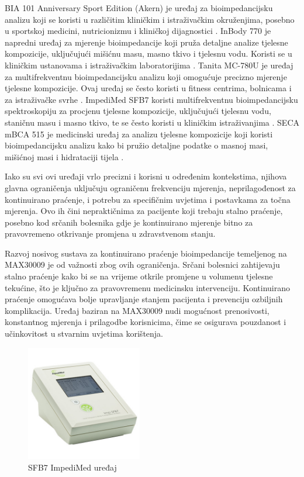 \documentclass[../diplomski_rad.tex]{subfiles}
\begin{document}
BIA 101 Anniversary Sport Edition (Akern) je uređaj za bioimpedancijsku analizu koji se koristi u različitim kliničkim 
i istraživačkim okruženjima, posebno u sportskoj medicini, nutricionizmu i kliničkoj dijagnostici \cite{Wiech2022}.  
InBody 770 je napredni uređaj za mjerenje bioimpedancije koji pruža detaljne analize tjelesne kompozicije, 
uključujući mišićnu masu, masno tkivo i tjelesnu vodu.  
Koristi se u kliničkim ustanovama i istraživačkim laboratorijima \cite{Choi2022}. 
Tanita MC-780U je uređaj za multifrekventnu bioimpedancijsku analizu koji omogućuje precizno mjerenje tjelesne kompozicije. 
Ovaj uređaj se često koristi u fitness centrima, bolnicama i za istraživačke svrhe \cite{Slazak2024}. 
ImpediMed SFB7 koristi multifrekventnu bioimpedancijsku spektroskopiju za procjenu tjelesne kompozicije, 
uključujući tjelesnu vodu, staničnu masu i masno tkivo, te se često koristi u kliničkim istraživanjima \cite{Freeborn2018}. 
SECA mBCA 515 je medicinski uređaj za analizu tjelesne kompozicije koji koristi bioimpedancijsku analizu 
kako bi pružio detaljne podatke o masnoj masi, mišićnoj masi i hidrataciji tijela \cite{Lahav2021}. 

Iako su svi ovi uređaji vrlo precizni i korisni u određenim kontekstima, 
njihova glavna ograničenja uključuju ograničenu frekvenciju mjerenja, 
neprilagođenost za kontinuirano praćenje, i potrebu za specifičnim uvjetima i postavkama za točna mjerenja. 
Ovo ih čini nepraktičnima za pacijente koji trebaju stalno praćenje, posebno kod srčanih bolesnika 
gdje je kontinuirano mjerenje bitno za pravovremeno otkrivanje promjena u zdravstvenom stanju.

Razvoj nosivog sustava za kontinuirano praćenje bioimpedancije 
temeljenog na MAX30009 je od važnosti zbog ovih ograničenja. 
Srčani bolesnici zahtijevaju stalno praćenje kako bi se na vrijeme otkrile promjene u volumenu tjelesne tekućine, 
što je ključno za pravovremenu medicinsku intervenciju. Kontinuirano praćenje omogućava bolje 
upravljanje stanjem pacijenta i prevenciju ozbiljnih komplikacija. 
Uređaj baziran na MAX30009 nudi mogućnost prenosivosti, konstantnog mjerenja i prilagodbe korisnicima, 
čime se osigurava pouzdanost i učinkovitost u stvarnim uvjetima korištenja.

\begin{figure}[htb]
    \centering
    \includegraphics[width=0.45\textwidth]{Figures/sfb7.jpg} 
    \caption{SFB7 ImpediMed uređaj \cite{sfb7}}
    \label{slk:sfb7}
\end{figure}
\end{document}
